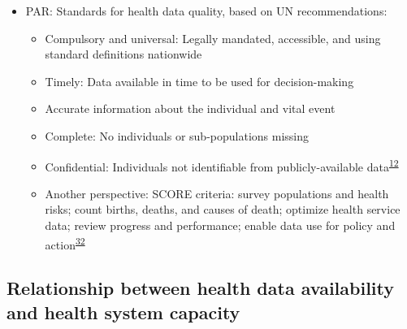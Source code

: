 \documentclass[
]{article}
\providecommand{\tightlist}{%
  \setlength{\itemsep}{0pt}\setlength{\parskip}{0pt}}
\begin{document}
\begin{itemize}
\tightlist
\item
  PAR: Standards for health data quality, based on UN recommendations:

  \begin{itemize}
  \tightlist
  \item
    Compulsory and universal: Legally mandated, accessible, and using standard definitions nationwide
  \item
    Timely: Data available in time to be used for decision-making
  \item
    Accurate information about the individual and vital event
  \item
    Complete: No individuals or sub-populations missing
  \item
    Confidential: Individuals not identifiable from publicly-available data\textsuperscript{\protect\hyperlink{ref-UnitedNationsStatisticsDivision2014}{12}}
  \item
    Another perspective: SCORE criteria: survey populations and health risks; count births, deaths, and causes of death; optimize health service data; review progress and performance; enable data use for policy and action\textsuperscript{\protect\hyperlink{ref-WorldHealthOrganization2021}{32}}
  \end{itemize}
\end{itemize}

\hypertarget{relationship-between-health-data-availability-and-health-system-capacity}{%
\subsection{Relationship between health data availability and health system capacity}\label{relationship-between-health-data-availability-and-health-system-capacity}}
\end{document}
